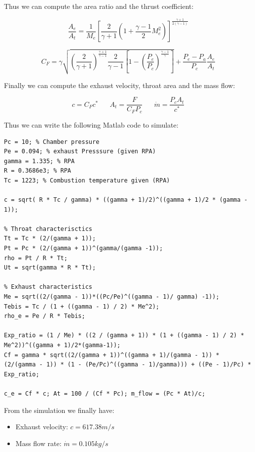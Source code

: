 \clearpage

Thus we can compute the area ratio and the thrust coefficient:

$$\frac{A_e}{A_t}= \frac{1}{M_e}\left[\frac{2}{\gamma + 1}\left(1 + \frac{\gamma - 1}{2} M_e^2 \right)\right]^{\frac{\gamma + 1}{2(\gamma - 1)}}$$

$$ C_F = \gamma \sqrt{\left(\frac{2}{\gamma + 1}\right)^{\frac{\gamma + 1}{\gamma - 1}}\frac{2}{\gamma - 1} \left[ 1 - \left(\frac{P_e}{P_c}\right)^{\frac{\gamma - 1}{\gamma}}\right]} + \frac{P_e - P_a}{P_c}\frac{A_e}{A_t} $$ 

\vspace{0.5cm}

Finally we can compute the exhaust velocity, throat area and the mass flow: 

$$c = C_F c^* \hspace{20pt} A_t = \frac{F}{C_F P_c} \hspace{20pt} \dot m = \frac{P_c A_t}{c^*}$$

Thus we can write the following Matlab code to simulate:

\begin{verbatim}
Pc = 10; % Chamber pressure
Pe = 0.094; % exhaust Presssure (given RPA)
gamma = 1.335; % RPA
R = 0.3686e3; % RPA
Tc = 1223; % Combustion temperature given (RPA)

c = sqrt( R * Tc / gamma) * ((gamma + 1)/2)^((gamma + 1)/2 * (gamma - 1));

% Throat characterisctics
Tt = Tc * (2/(gamma + 1));
Pt = Pc * (2/(gamma + 1))^(gamma/(gamma -1));
rho = Pt / R * Tt;
Ut = sqrt(gamma * R * Tt);

% Exhaust characteristics
Me = sqrt((2/(gamma - 1))*((Pc/Pe)^((gamma - 1)/ gamma) -1));
Tebis = Tc / (1 + ((gamma - 1) / 2) * Me^2);
rho_e = Pe / R * Tebis;

Exp_ratio = (1 / Me) * ((2 / (gamma + 1)) * (1 + ((gamma - 1) / 2) * Me^2))^((gamma + 1)/2*(gamma-1));
Cf = gamma * sqrt((2/(gamma + 1))^((gamma + 1)/(gamma - 1)) * (2/(gamma - 1)) * (1 - (Pe/Pc)^((gamma - 1)/gamma))) + ((Pe - 1)/Pc) * Exp_ratio;

c_e = Cf * c; At = 100 / (Cf * Pc); m_flow = (Pc * At)/c;
\end{verbatim}

From the simulation we finally have:

\begin{itemize}
    \item Exhaust velocity: $c=617.38m/s$
    \vspace{-0.4cm}
    \item Mass flow rate: $\dot m = 0.105 kg/s$
\end{itemize}

